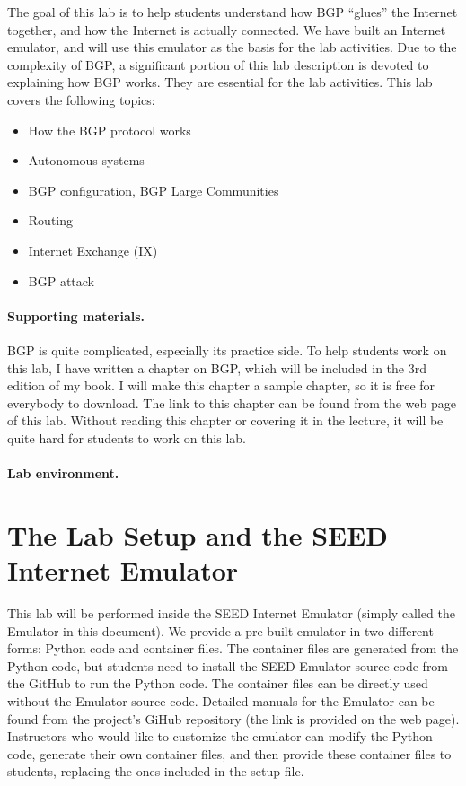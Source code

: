 The goal of this lab is to help students understand how
BGP ``glues'' the Internet together, and how the Internet is actually
connected. We have built an Internet emulator, and will 
use this emulator as the basis for the lab activities. Due to the 
complexity of BGP, a significant portion of this lab description 
is devoted to explaining how BGP works. They are 
essential for the lab activities. 
This lab covers the following topics:
\begin{itemize}[noitemsep]
\item How the BGP protocol works
\item Autonomous systems
\item BGP configuration, BGP Large Communities 
\item Routing 
\item Internet Exchange (IX)
\item BGP attack
\end{itemize}


\paragraph{Supporting materials.}
BGP is quite complicated, especially its practice side.
To help students work on this lab, I have written a chapter on
BGP, which will be included in the 3rd edition of my book.
I will make this chapter a sample chapter, so it is free
for everybody to download. 
The link to this chapter can be found from the web page of this lab.
Without reading this chapter
or covering it in the lecture, it will be quite hard 
for students to work on this lab.


\paragraph{Lab environment.} 
\seedenvironmentB
\nodependency



\section{The Lab Setup and the SEED Internet Emulator} 

This lab will be performed inside the SEED Internet Emulator (simply
called the Emulator in this document). 
We provide a pre-built emulator in two different forms: Python code
and container files. The container files are generated from
the Python code, but students need to install the SEED Emulator source 
code from the GitHub to run the Python code. The container files
can be directly used without the Emulator source code. 
Detailed manuals for the Emulator can be found from 
the project's GiHub repository (the link is provided on the web page).
Instructors who would like to customize the emulator can modify the Python
code, generate their own container files, and then provide these
container files to students, replacing the ones included in the 
setup file.



